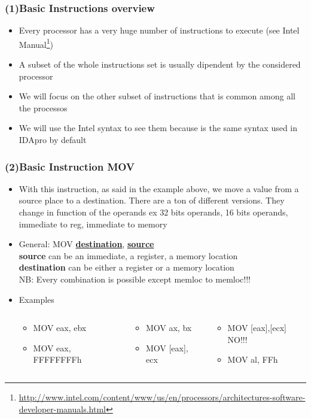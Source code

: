 \documentclass[]{beamer}
\begin{document}
		\begin{frame}
			\frametitle{(1)Basic Instructions overview}
				\begin{itemize}
					\item{Every processor has a very huge number of instructions to execute (see Intel Manual\footnote{\url{http://www.intel.com/content/www/us/en/processors/architectures-software-developer-manuals.html}})}
					\item{A subset of the whole instructions set is usually dipendent by the considered processor}
					\item{We will focus on the other subset of instructions that is common among all the processos}
					\item{We will use the Intel syntax to see them because is the same syntax used in IDApro by default}
				\end{itemize}
		\end{frame}
		\begin{frame}
			\frametitle{(2)Basic Instruction MOV}
				\begin{itemize}
					\item{With this instruction, as said in the example above, we move a value from a source place to a destination. There are a ton of different versions. They change in function of the operands ex 32 bits operands, 16 bits operands, immediate to reg, immediate to memory }
					\item{ General: MOV \underline{\textbf{destination}}, \underline{\textbf{source}}\\
						\textbf{source} can be an immediate, a register, a memory location\\
						\textbf{destination} can be either a register  or a memory location\\
						NB: Every combination is possible except memloc to memloc!!!}
					\item{Examples}
						\begin{columns}
							\begin{column}[left]{1.7in}
								\begin{itemize}
									\item{MOV eax, ebx}
									\item{MOV eax, FFFFFFFFh}
								\end{itemize}
							\end{column}
							\begin{column}[center]{1.5in}
								\begin{itemize}
									\item{MOV ax, bx}
									\item{MOV [eax], ecx}
								\end{itemize}
							\end{column}
							\begin{column}[right]{2in}
								\begin{itemize}
									\item{MOV [eax],[ecx]  NO!!!}
									\item{MOV al, FFh}
								\end{itemize}
							\end{column}
						\end{columns}
				\end{itemize}
		\end{frame}
\end{document}
